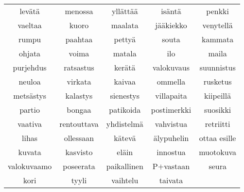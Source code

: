 \begin{center}
  \begin{tabular}{|c c c c c|}
    \hline
    levätä & menossa & yllättää & isäntä & penkki \\
    vaeltaa & kuoro & maalata & jääkiekko & venytellä \\
    rumpu & paahtaa & pettyä & souta & kammata \\
    ohjata & voima & matala & ilo & maila \\
    purjehdus & ratsastus & kerätä & valokuvaus & suunnistus \\
    neuloa & virkata & kaivaa & ommella & rusketus \\
    metsästys & kalastys & sienestys & villapaita & kiipeillä \\
    partio & bongaa & patikoida & postimerkki & suosikki \\
    vaativa & rentouttava & yhdistelmä & vahvistua & retriitti \\
    lihas & ollessaan & kätevä & älypuhelin & ottaa esille \\
    kuvata & kasvisto & eläin & innostua & muotokuva \\
    valokuvaamo & poseerata & paikallinen & P$+$vastaan & seura \\
    kori & tyyli & vaihtelu & taivata & \\
    \hline
  \end{tabular}
\end{center}

